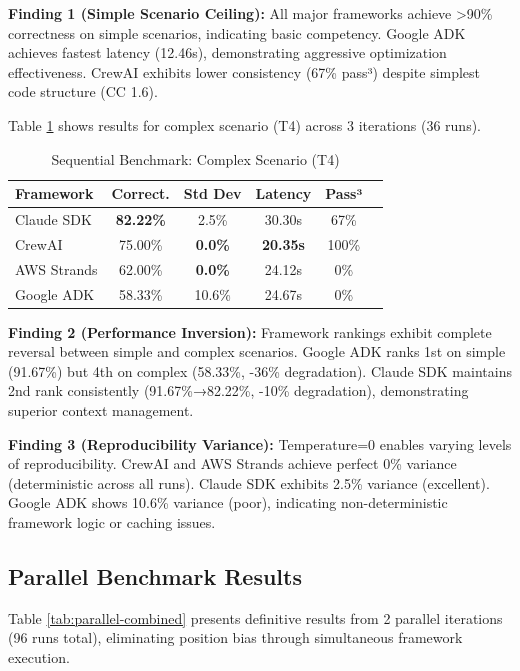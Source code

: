\documentclass[sigconf,nonacm]{acmart}
\begin{document}
\textbf{Finding 1 (Simple Scenario Ceiling):} All major frameworks achieve >90\% correctness on simple scenarios, indicating basic competency. Google ADK achieves fastest latency (12.46s), demonstrating aggressive optimization effectiveness. CrewAI exhibits lower consistency (67\% pass³) despite simplest code structure (CC 1.6).

Table \ref{tab:sequential-complex} shows results for complex scenario (T4) across 3 iterations (36 runs).

\begin{table}[h]
\caption{Sequential Benchmark: Complex Scenario (T4)}
\label{tab:sequential-complex}
\begin{tabular}{lccccc}
\toprule
\textbf{Framework} & \textbf{Correct.} & \textbf{Std Dev} & \textbf{Latency} & \textbf{Pass³} \\
\midrule
Claude SDK & \textbf{82.22\%} & 2.5\% & 30.30s & 67\% \\
CrewAI & 75.00\% & \textbf{0.0\%} & \textbf{20.35s} & 100\% \\
AWS Strands & 62.00\% & \textbf{0.0\%} & 24.12s & 0\% \\
Google ADK & 58.33\% & 10.6\% & 24.67s & 0\% \\
\bottomrule
\end{tabular}
\end{table}

\textbf{Finding 2 (Performance Inversion):} Framework rankings exhibit complete reversal between simple and complex scenarios. Google ADK ranks 1st on simple (91.67\%) but 4th on complex (58.33\%, -36\% degradation). Claude SDK maintains 2nd rank consistently (91.67\%→82.22\%, -10\% degradation), demonstrating superior context management.

\textbf{Finding 3 (Reproducibility Variance):} Temperature=0 enables varying levels of reproducibility. CrewAI and AWS Strands achieve perfect 0\% variance (deterministic across all runs). Claude SDK exhibits 2.5\% variance (excellent). Google ADK shows 10.6\% variance (poor), indicating non-deterministic framework logic or caching issues.

\subsection{Parallel Benchmark Results}

Table \ref{tab:parallel-combined} presents definitive results from 2 parallel iterations (96 runs total), eliminating position bias through simultaneous framework execution.
\end{document}
